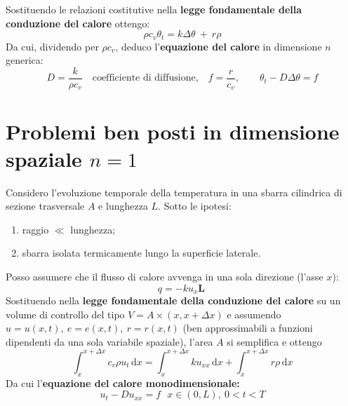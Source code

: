 \documentclass[10pt,a4paper,twoside,openright]{book}
\newcommand{\de}{\,\mathrm d}
\newcommand{\dx}{\de x}
\begin{document}
Sostituendo le relazioni costitutive nella \textbf{legge fondamentale della conduzione del calore} ottengo:
\begin{equation*}
\boxed{\rho c_{v} \theta _{t} =k\Delta \theta \ +\ r\rho }
\end{equation*}
Da cui, dividendo per $\displaystyle \rho c_{v}$, deduco l'\textbf{equazione del calore} in dimensione $n$ generica:
\begin{equation*}
D=\frac{k}{\rho c_{v}} \quad \text{coefficiente di diffusione,} \quad f=\frac{r}{c_{v}}, \qquad \boxed{\theta _{t} -D\Delta \theta =f}
\end{equation*}

\section{Problemi ben posti in dimensione spaziale \texorpdfstring{$n=1$}{n=1}}

Considero l'evoluzione temporale della temperatura in una sbarra cilindrica di sezione trasversale $A$ e lunghezza $L$. Sotto le ipotesi:
\begin{enumerate}
\item  raggio $\ll$ lunghezza;
\item  sbarra isolata termicamente lungo la superficie laterale.
\end{enumerate}

Posso assumere che il flusso di calore avvenga in una sola direzione (l'asse $x$):
\begin{equation*}
q=-ku_{x}\mathbf{L} \ 
\end{equation*}
Sostituendo nella \textbf{legge fondamentale della conduzione del calore} su un volume di controllo del tipo $\displaystyle V=A\times (x,x+\Delta x)$ e assumendo $\displaystyle u=u(x,t),\ e=e(x,t),\ r=r(x,t)$ (ben approssimabili a funzioni dipendenti da una sola variabile spaziale), l'area $A$ si semplifica e ottengo
\begin{equation*}
\int ^{x+\Delta x}_{x} c_{v} \rho u_{t} \dx=\int ^{x+\Delta x}_{x} ku_{xx} \dx+\int ^{x+\Delta x}_{x} r\rho \dx
\end{equation*}
Da cui l'\textbf{equazione del calore monodimensionale:}
\begin{equation*}
\boxed{u_{t} -Du_{xx} =f} \ \ \ x\in (0,L),\ 0< t< T
\end{equation*}
\end{document}
